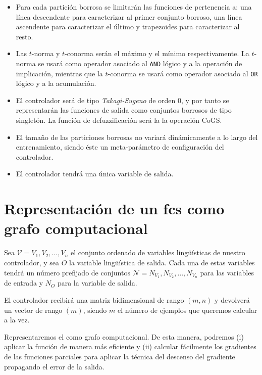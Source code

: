 \begin{itemize}
	\item Para cada partición borrosa se limitarán las funciones de pertenencia a: una línea descendente para caracterizar al primer conjunto borroso, una línea ascendente para caracterizar el último y trapezoides para caracterizar al resto.
	\item Las $t$-norma y $t$-conorma serán el máximo y el mínimo respectivamente. La $t$-norma se usará como operador asociado al \texttt{AND} lógico y a la operación de implicación, mientras que la $t$-conorma se usará como operador asociado al \texttt{OR} lógico y a la acumulación.
	\item El controlador será de tipo \textit{Takagi-Sugeno} de orden $0$, y por tanto se representarán las funciones de salida como conjuntos borrosos de tipo singletón. La función de defuzzificación será la la operación CoGS.
	\item El tamaño de las particiones borrosas no variará dinámicamente a lo largo del entrenamiento, siendo éste un meta-parámetro de configuración del controlador.
	\item El controlador tendrá una única variable de salida.
\end{itemize}

\section{Representación de un \acrshort{fcs} como grafo computacional}

Sea $\mathcal{V} = {V_1, V_2, \ldots, V_n}$ el conjunto ordenado de variables lingüísticas de nuestro controlador, y sea $O$ la variable lingüística de salida. Cada una de estas variables tendrá un número prefijado de conjuntos $\mathcal{N} = {N_{V_1}, N_{V_2}, \ldots, N_{V_n}}$ para las variables de entrada y $N_O$ para la variable de salida.

El controlador recibirá una matriz bidimensional de rango $(m, n)$ y devolverá un vector de rango $(m)$, siendo $m$ el número de ejemplos que queremos calcular a la vez.

Representaremos el  como grafo computacional. De esta manera, podremos (i) aplicar la función de manera más eficiente y (ii) calcular fácilmente los gradientes de las funciones parciales para aplicar la técnica del descenso del gradiente propagando el error de la salida.

